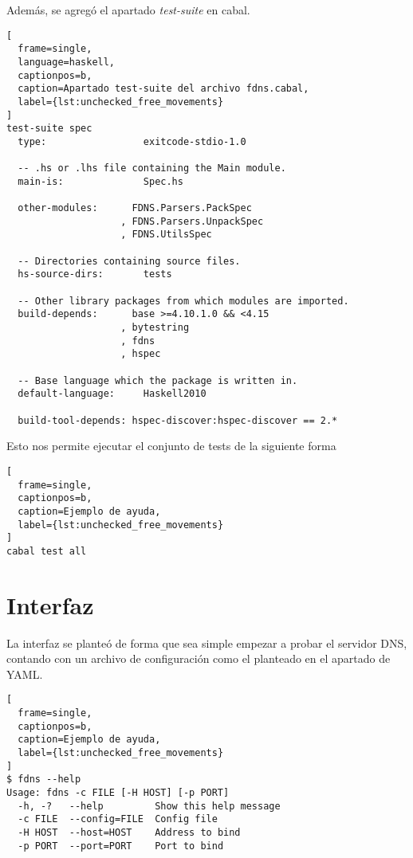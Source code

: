 \documentclass[6pt]{article}
\begin{document}
Además, se agregó el apartado \textit{test-suite} en cabal.

\begin{lstlisting}[
  frame=single,
  language=haskell,
  captionpos=b,
  caption=Apartado test-suite del archivo fdns.cabal,
  label={lst:unchecked_free_movements}
]
test-suite spec
  type:                 exitcode-stdio-1.0

  -- .hs or .lhs file containing the Main module.
  main-is:              Spec.hs

  other-modules:      FDNS.Parsers.PackSpec
                    , FDNS.Parsers.UnpackSpec
                    , FDNS.UtilsSpec

  -- Directories containing source files.
  hs-source-dirs:       tests

  -- Other library packages from which modules are imported.
  build-depends:      base >=4.10.1.0 && <4.15
                    , bytestring
                    , fdns
                    , hspec

  -- Base language which the package is written in.
  default-language:     Haskell2010

  build-tool-depends: hspec-discover:hspec-discover == 2.*
\end{lstlisting}

Esto nos permite ejecutar el conjunto de tests de la siguiente forma

\begin{lstlisting}[
  frame=single,
  captionpos=b,
  caption=Ejemplo de ayuda,
  label={lst:unchecked_free_movements}
]
cabal test all
\end{lstlisting}


\section{Interfaz}

La interfaz se planteó de forma que sea simple empezar a probar el
servidor DNS, contando con un archivo de configuración como el
planteado en el apartado de YAML.

\begin{lstlisting}[
  frame=single,
  captionpos=b,
  caption=Ejemplo de ayuda,
  label={lst:unchecked_free_movements}
]
$ fdns --help
Usage: fdns -c FILE [-H HOST] [-p PORT]
  -h, -?   --help         Show this help message
  -c FILE  --config=FILE  Config file
  -H HOST  --host=HOST    Address to bind
  -p PORT  --port=PORT    Port to bind
\end{lstlisting}
\end{document}
